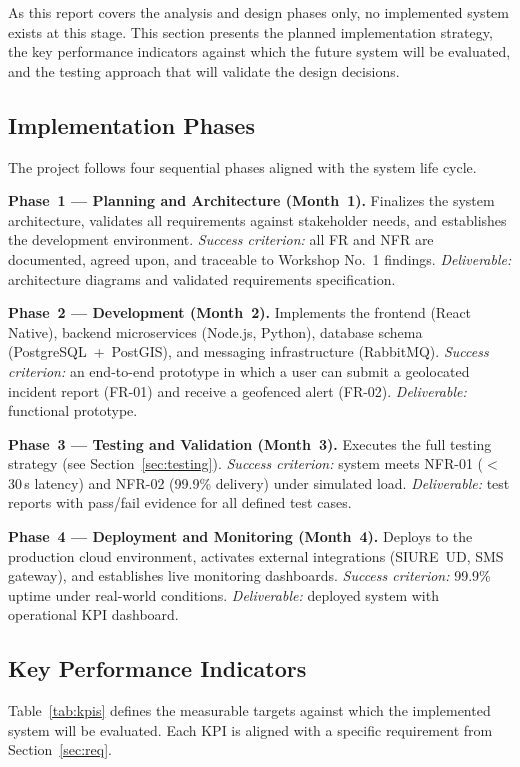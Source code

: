\documentclass[12pt, oneside]{article}
\begin{document}
As this report covers the analysis and design phases only, no implemented system
exists at this stage. This section presents the planned implementation strategy,
the key performance indicators against which the future system will be evaluated,
and the testing approach that will validate the design decisions.

\subsection{Implementation Phases}

The project follows four sequential phases aligned with the system life cycle.

\textbf{Phase~1 --- Planning and Architecture (Month~1).} Finalizes the system
architecture, validates all requirements against stakeholder needs, and establishes the
development environment. \textit{Success criterion:} all FR and NFR are documented,
agreed upon, and traceable to Workshop No.~1 findings. \textit{Deliverable:}
architecture diagrams and validated requirements specification.

\textbf{Phase~2 --- Development (Month~2).} Implements the frontend (React Native),
backend microservices (Node.js, Python), database schema (PostgreSQL~+~PostGIS), and
messaging infrastructure (RabbitMQ). \textit{Success criterion:} an end-to-end prototype
in which a user can submit a geolocated incident report (FR-01) and receive a geofenced
alert (FR-02). \textit{Deliverable:} functional prototype.

\textbf{Phase~3 --- Testing and Validation (Month~3).} Executes the full testing
strategy (see Section~\ref{sec:testing}). \textit{Success criterion:} system meets
NFR-01 ($<$30\,s latency) and NFR-02 (99.9\% delivery) under simulated load.
\textit{Deliverable:} test reports with pass/fail evidence for all defined test cases.

\textbf{Phase~4 --- Deployment and Monitoring (Month~4).} Deploys to the production
cloud environment, activates external integrations (SIURE~UD, SMS gateway), and
establishes live monitoring dashboards. \textit{Success criterion:} 99.9\% uptime
under real-world conditions. \textit{Deliverable:} deployed system with operational
KPI dashboard.

\subsection{Key Performance Indicators}

Table~\ref{tab:kpis} defines the measurable targets against which the implemented
system will be evaluated. Each KPI is aligned with a specific requirement from
Section~\ref{sec:req}.
\end{document}
